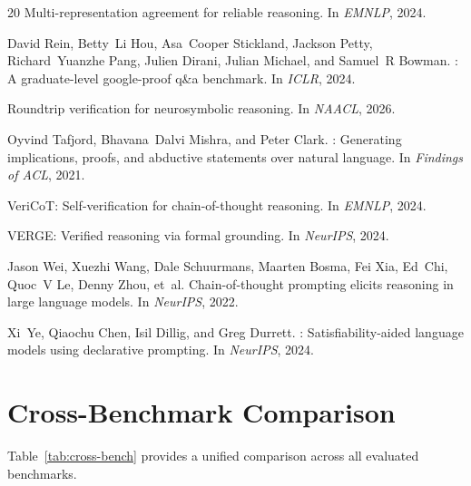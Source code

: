 \documentclass[11pt,a4paper]{article}
\begin{document}
\begin{thebibliography}{20}
Multi-representation agreement for reliable reasoning.
\newblock In \emph{EMNLP}, 2024.

David Rein, Betty~Li Hou, Asa~Cooper Stickland, Jackson Petty, Richard~Yuanzhe Pang, Julien Dirani, Julian Michael, and Samuel~R Bowman.
: A graduate-level google-proof q\&a benchmark.
\newblock In \emph{ICLR}, 2024.

Roundtrip verification for neurosymbolic reasoning.
\newblock In \emph{NAACL}, 2026.

Oyvind Tafjord, Bhavana~Dalvi Mishra, and Peter Clark.
: Generating implications, proofs, and abductive statements over natural language.
\newblock In \emph{Findings of ACL}, 2021.

{VeriCoT}: Self-verification for chain-of-thought reasoning.
\newblock In \emph{EMNLP}, 2024.

{VERGE}: Verified reasoning via formal grounding.
\newblock In \emph{NeurIPS}, 2024.

Jason Wei, Xuezhi Wang, Dale Schuurmans, Maarten Bosma, Fei Xia, Ed~Chi, Quoc~V Le, Denny Zhou, et~al.
\newblock Chain-of-thought prompting elicits reasoning in large language models.
\newblock In \emph{NeurIPS}, 2022.

Xi~Ye, Qiaochu Chen, Isil Dillig, and Greg Durrett.
: Satisfiability-aided language models using declarative prompting.
\newblock In \emph{NeurIPS}, 2024.

\end{thebibliography}

\appendix
\section{Cross-Benchmark Comparison}
\label{app:cross-bench}

Table~\ref{tab:cross-bench} provides a unified comparison across all evaluated benchmarks.
\end{document}
